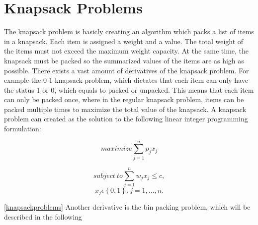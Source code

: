 \section{Knapsack Problems}
\label{sec:knapsack}
The knapsack problem is basicly creating an algorithm which packs a list of items in a knapsack. Each item is assigned a weight and a value. The total weight of the items must not exceed the maximum weight capacity. At the same time, the knapsack must be packed so the summarized values of the items are as high as possible. There exists a vast amount of derivatives of the knapsack problem. For example the 0-1 knapsack problem, which dictates that each item can only have the status 1 or 0, which equals to packed or unpacked. This means that each item can only be packed once, where in the regular knapsack problem, items can be packed multiple times to maximize the total value of the knapsack. A knapsack problem can created as the solution to the following linear integer programming formulation: 

\[maximize \sum\limits_{j=1}^n p_jx_j\]

\[subject~to \sum\limits_{j=1}^n w_jx_j\leq c,\]
\[x_j \epsilon \left \{ 0,1 \right \}, j=1,...,n.\]


 \ref{knapsackproblems}
\newline
Another derivative is the bin packing problem, which will be described in the following